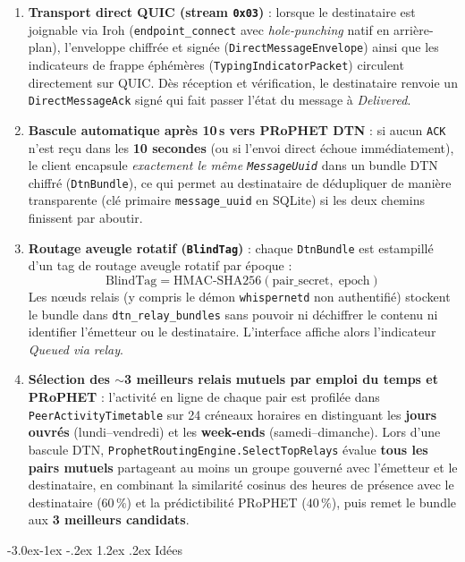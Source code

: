 \documentclass[11pt,a4paper]{article}
\makeatletter
\renewcommand\subsection{\@startsection{subsection}{2}{\z@}%
                                     {-3.0ex\@plus -1ex \@minus -.2ex}%
                                     {1.2ex \@plus .2ex}%
                                     {\normalfont\large\bfseries\color{PrimaryBlue}}}
\makeatother
\begin{document}
\begin{enumerate}
    \item \textbf{Transport direct QUIC (stream \texttt{0x03})} : lorsque le destinataire est joignable via Iroh (\texttt{endpoint\_connect} avec \emph{hole-punching} natif en arrière-plan), l'enveloppe chiffrée et signée (\texttt{DirectMessageEnvelope}) ainsi que les indicateurs de frappe éphémères (\texttt{TypingIndicatorPacket}) circulent directement sur QUIC. Dès réception et vérification, le destinataire renvoie un \texttt{DirectMessageAck} signé qui fait passer l'état du message à \emph{Delivered}.
    \item \textbf{Bascule automatique après 10\,s vers PRoPHET DTN} : si aucun \texttt{ACK} n'est reçu dans les \textbf{10 secondes} (ou si l'envoi direct échoue immédiatement), le client encapsule \emph{exactement le même \texttt{MessageUuid}} dans un bundle DTN chiffré (\texttt{DtnBundle}), ce qui permet au destinataire de dédupliquer de manière transparente (clé primaire \texttt{message\_uuid} en SQLite) si les deux chemins finissent par aboutir.
    \item \textbf{Routage aveugle rotatif (\texttt{BlindTag})} : chaque \texttt{DtnBundle} est estampillé d'un tag de routage aveugle rotatif par époque :
    \[
        \text{BlindTag} = \text{HMAC-SHA256}(\text{pair\_secret},\; \text{epoch})
    \]
    Les nœuds relais (y compris le démon \texttt{whispernetd} non authentifié) stockent le bundle dans \texttt{dtn\_relay\_bundles} sans pouvoir ni déchiffrer le contenu ni identifier l'émetteur ou le destinataire. L'interface affiche alors l'indicateur \emph{Queued via relay}.
    \item \textbf{Sélection des $\sim$3 meilleurs relais mutuels par emploi du temps et PRoPHET} : l'activité en ligne de chaque pair est profilée dans \texttt{PeerActivityTimetable} sur 24 créneaux horaires en distinguant les \textbf{jours ouvrés} (lundi--vendredi) et les \textbf{week-ends} (samedi--dimanche). Lors d'une bascule DTN, \texttt{ProphetRoutingEngine.SelectTopRelays} évalue \textbf{tous les pairs mutuels} partageant au moins un groupe gouverné avec l'émetteur et le destinataire, en combinant la similarité cosinus des heures de présence avec le destinataire ($60\,\%$) et la prédictibilité PRoPHET ($40\,\%$), puis remet le bundle aux \textbf{3 meilleurs candidats}.
\end{enumerate}

\subsection{Idées}
\end{document}
